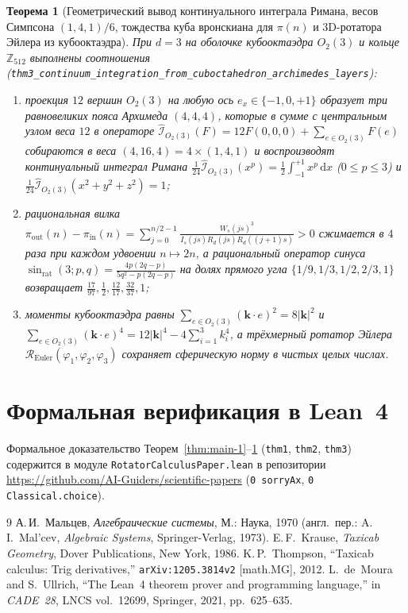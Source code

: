 \documentclass[11pt,a4paper]{article}
\theoremstyle{plain}
\newtheorem{theorem}{Теорема}[section]
\theoremstyle{definition}
\begin{document}
\begin{theorem}[Геометрический вывод континуального интеграла Римана, весов Симпсона $(1,4,1)/6$, тождества куба вронскиана для $\pi(n)$ и 3D-ротатора Эйлера из кубооктаэдра]
\label{thm:main-3}
При $d=3$ на оболочке кубооктаэдра $O_2(3)$ и кольце $\mathbb{Z}_{512}$ выполнены соотношения (\texttt{thm3\_continuum\_integration\_from\_cuboctahedron\_archimedes\_layers}):
\begin{enumerate}[label=\textbf{(\roman*)},leftmargin=*]
\item проекция $12$ вершин $O_2(3)$ на любую ось $e_x\in\{-1,0,+1\}$ образует три равновеликих пояса Архимеда $(4,4,4)$, которые в сумме с центральным узлом веса $12$ в операторе $\widehat{\mathcal{I}}_{O_2(3)}(F) = 12 F(0,0,0) + \sum_{e\in O_2(3)} F(e)$ собираются в веса $(4,16,4) = 4\times(1,4,1)$ и воспроизводят континуальный интеграл Римана $\frac{1}{24}\widehat{\mathcal{I}}_{O_2(3)}(x^p) = \frac{1}{2}\int_{-1}^{+1}x^p\,\mathrm{d}x$ ($0\le p\le 3$) и $\frac{1}{24}\widehat{\mathcal{I}}_{O_2(3)}(x^2+y^2+z^2) = 1$;
\item рациональная вилка $\pi_{\mathrm{out}}(n) - \pi_{\mathrm{in}}(n) = \sum_{j=0}^{n/2-1}\frac{W_s(js)^3}{I_s(js)R_d(js)R_d((j+1)s)} > 0$ сжимается в $4$ раза при каждом удвоении $n\mapsto 2n$, а рациональный оператор синуса $\sin_{\mathrm{rat}}(3;p,q) = \frac{4p(2q-p)}{5q^2-p(2q-p)}$ на долях прямого угла $\{1/9,1/3,1/2,2/3,1\}$ возвращает $\frac{17}{97},\frac{1}{2},\frac{12}{17},\frac{32}{37},1$;
\item моменты кубооктаэдра равны $\sum_{e\in O_2(3)}(\mathbf{k}\cdot e)^2 = 8|\mathbf{k}|^2$ и $\sum_{e\in O_2(3)}(\mathbf{k}\cdot e)^4 = 12|\mathbf{k}|^4 - 4\sum_{i=1}^3 k_i^4$, а трёхмерный ротатор Эйлера $\mathcal{R}_{\mathrm{Euler}}(\varphi_1,\varphi_2,\varphi_3)$ сохраняет сферическую норму в чистых целых числах.
\end{enumerate}
\end{theorem}

\section{Формальная верификация в Lean~4}
Формальное доказательство Теорем~\ref{thm:main-1}--\ref{thm:main-3} (\texttt{thm1}, \texttt{thm2}, \texttt{thm3}) содержится в модуле \texttt{RotatorCalculusPaper.lean} в репозитории \url{https://github.com/AI-Guiders/scientific-papers} (\texttt{0 sorryAx}, \texttt{0 Classical.choice}).

\begin{thebibliography}{9}
А.\,И.~Мальцев, \emph{Алгебраические системы}, М.: Наука, 1970 (англ.\ пер.: A.\,I.~Mal'cev, \emph{Algebraic Systems}, Springer-Verlag, 1973).
E.\,F.~Krause, \emph{Taxicab Geometry}, Dover Publications, New York, 1986.
K.\,P.~Thompson, ``Taxicab calculus: Trig derivatives,'' \texttt{arXiv:1205.3814v2} [math.MG], 2012.
L.~de~Moura and S.~Ullrich, ``The Lean~4 theorem prover and programming language,'' in \emph{CADE~28}, LNCS vol.~12699, Springer, 2021, pp.~625--635.
\end{thebibliography}
\end{document}
